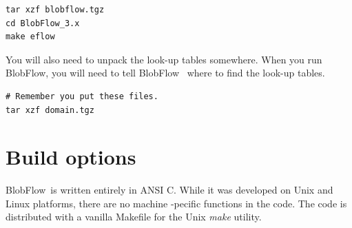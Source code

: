 \documentclass[12pt]{report}
\newcommand{\BF}{BlobFlow}
\begin{document}
\begin{verbatim}
tar xzf blobflow.tgz
cd BlobFlow_3.x
make eflow
\end{verbatim}

You will also need to unpack the look-up tables somewhere.  When you run \BF,
you will need to tell \BF~ where to find the look-up tables.

\begin{verbatim}
# Remember you put these files.
tar xzf domain.tgz
\end{verbatim}

\section{Build options}

\BF~is written entirely in ANSI C.  While it was developed on Unix and Linux
platforms, there are no machine -pecific functions in the code.  The code is
distributed with a vanilla Makefile for the Unix {\em make} utility.
\end{document}
